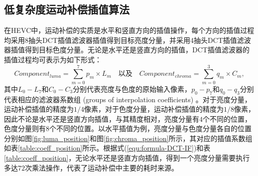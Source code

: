 \subsection{低复杂度运动补偿插值算法}

在HEVC中，运动补偿的实质是水平和竖直方向的插值操作，每个方向的插值过程均采用8抽头DCT插值滤波器插值得到目标亮度分量，并采用4抽头DCT插值滤波器插值得到目标色度分量。无论是水平还是竖直方向的插值，DCT插值滤波器的插值过程均可表示为如下形式：
\begin{equation}\label{equ:formula-DCT-IF}
Component_{luma} = \sum_{m=0}^7 p_m \times L_m \quad \texttt{以及} \quad Component_{chroma} = \sum_{m=0}^3 q_m \times C_m,
\end{equation}
其中$L_0 - L_7$和$C_0 - C_3$分别代表亮度与色度的原始输入像素，$p_0 - p_7$和$q_0 - q_3$分别代表相应的滤波器系数组 (groups of interpolation coefficients) 。对于亮度分量，运动补偿插值的精度为$1/4$像素，对于色度分量，运动补偿插值的精度为$1/8$像素，因此不论是水平还是竖直方向插值，与其精度相对，亮度分量有$4$个不同的位置，色度分量则有$8$个不同的位置。以水平插值为例，亮度分量与色度分量各自的位置分别如图\ref{fig:luma_position}和图\ref{fig:chroma_position}所示，其对应的插值系数组如表\ref{table:coeff_position}所示。根据式(\ref{equ:formula-DCT-IF})和表\ref{table:coeff_position}，无论水平还是竖直方向插值，得到一个亮度分量需要执行多达$72$次乘法操作，代表了运动补偿中主要的耗时来源。


